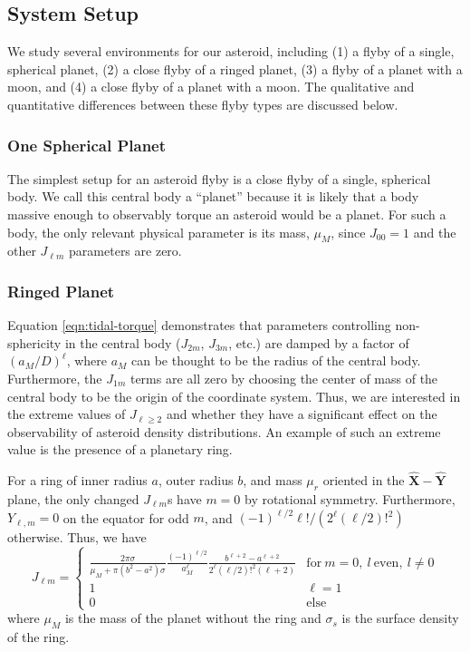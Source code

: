 \documentclass[linenumbers]{aastex631}
\newcommand{\unit}[1]{\hat{\mathbf{#1}}}
\begin{document}
\subsection{System Setup}
We study several environments for our asteroid, including (1) a flyby of a single, spherical planet, (2) a close flyby of a ringed planet, (3) a flyby of a planet with a moon, and (4) a close flyby of a planet with a moon. The qualitative and quantitative differences between these flyby types are discussed below.

\subsubsection{One Spherical Planet}
The simplest setup for an asteroid flyby is a close flyby of a single, spherical body. We call this central body a ``planet'' because it is likely that a body massive enough to observably torque an asteroid would be a planet. For such a body, the only relevant physical parameter is its mass, $\mu_M$, since $J_{00} = 1$ and the other $J_{\ell m}$ parameters are zero.

\subsubsection{Ringed Planet}
Equation \ref{eqn:tidal-torque} demonstrates that parameters controlling non-sphericity in the central body ($J_{2m}$, $J_{3m}$, etc.) are damped by a factor of $(a_M/D)^\ell$, where $a_M$ can be thought to be the radius of the central body. Furthermore, the $J_{1m}$ terms are all zero by choosing the center of mass of the central body to be the origin of the coordinate system. Thus, we are interested in the extreme values of $J_{\ell \geq 2}$ and whether they have a significant effect on the observability of asteroid density distributions. An example of such an extreme value is the presence of a planetary ring.

For a ring of inner radius $a$, outer radius $b$, and mass $\mu_r$ oriented in the $\unit X-\unit Y$ plane, the only changed $J_{\ell m}$s have $m = 0$ by rotational symmetry. Furthermore, $Y_{\ell, m} = 0$ on the equator for odd $m$, and $(-1)^{\ell/2} \ell! / (2^\ell (\ell/2)!^2)$ otherwise. Thus, we have
\begin{equation}
J_{\ell m} = \left\{\begin{array}{cc}
\frac{2 \pi \sigma}{\mu_M + \pi(b^2-a^2)\sigma}\frac{(-1)^{\ell/2}}{a_M^\ell}\frac{b^{\ell+2} - a^{\ell+2}}{2^\ell (\ell/2)!^2 (\ell + 2)}
 & \text{for}\ m = 0,\ l\ \text{even},\ l \neq 0\\
1 & \ell = 1\\
0 & \text{else}
\end{array}\right.
\label{eqn:ring-jlm}
\end{equation}
where $\mu_M$ is the mass of the planet without the ring and $\sigma_s$ is the surface density of the ring.
\end{document}
